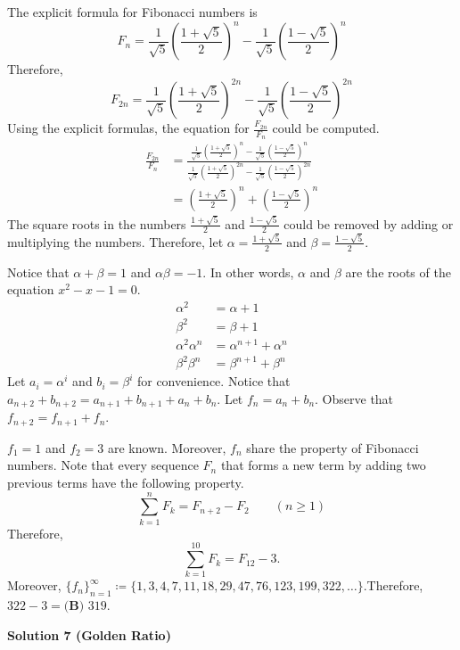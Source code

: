 \begin{enumerate}
 The explicit formula for Fibonacci numbers is
 \[F_n = \frac{1}{\sqrt{5}} \left( \frac{1 + \sqrt{5}}{2} \right)^n - \frac{1}{\sqrt{5}} \left( \frac{1 - \sqrt{5}}{2} \right)^n\]Therefore,
 \[F_{2n} = \frac{1}{\sqrt{5}} \left( \frac{1 + \sqrt{5}}{2} \right)^{2n} - \frac{1}{\sqrt{5}} \left( \frac{1 - \sqrt{5}}{2} \right)^{2n}\]Using the explicit formulas, the equation for $\frac{F_{2n}}{F_n}$ could be computed.
 \begin{align*}     \frac{F_{2n}}{F_n}     &= \frac{\frac{1}{\sqrt{5}} \left( \frac{1 + \sqrt{5}}{2} \right)^n - \frac{1}{\sqrt{5}} \left( \frac{1 - \sqrt{5}}{2} \right)^n}{\frac{1}{\sqrt{5}} \left( \frac{1 + \sqrt{5}}{2} \right)^{2n} - \frac{1}{\sqrt{5}} \left( \frac{1 - \sqrt{5}}{2} \right)^{2n}} \\     &= \left( \frac{1 + \sqrt{5}}{2} \right)^n + \left( \frac{1 - \sqrt{5}}{2} \right)^n \end{align*}
The square roots in the numbers $\frac{1 + \sqrt{5}}{2}$ and $\frac{1 - \sqrt{5}}{2}$ could be removed by adding or multiplying the numbers. Therefore, let $\alpha = \frac{1 + \sqrt{5}}{2}$ and $\beta = \frac{1 - \sqrt{5}}{2}$.

 
Notice that $\alpha + \beta = 1$ and $\alpha\beta = -1$. In other words, $\alpha$ and $\beta$ are the roots of the equation $x^2 - x - 1 = 0$.
 \begin{align*}     \alpha^2 &= \alpha + 1 \\     \beta^2 &= \beta + 1 \\     \alpha^2 \alpha^n &= \alpha^{n + 1} + \alpha^n \\     \beta^2 \beta^n &= \beta^{n + 1} + \beta^n \end{align*}
Let $a_i = \alpha^i$ and $b_i = \beta^i$ for convenience. Notice that $a_{n + 2} + b_{n + 2} = a_{n + 1} + b_{n + 1} + a_n + b_n$. Let $f_n = a_n + b_n$. Observe that $f_{n + 2} = f_{n + 1} + f_n$.

 
$f_1 = 1$ and $f_2 = 3$ are known. Moreover, $f_n$ share the property of Fibonacci numbers. Note that every sequence $F_n$ that forms a new term by adding two previous terms have the following property.
 \[\sum_{k=1}^{n} F_k = F_{n+2} - F_2 \qquad (n \geq 1)\]Therefore,
 \[\sum_{k=1}^{10} F_k = F_{12} - 3.\]Moreover, $\{f_n\}_{n=1}^\infty \coloneq \{ 1, 3, 4, 7, 11, 18, 29, 47, 76, 123, 199, 322, \dots \}$.Therefore, $322 - 3 = \boxed{\textbf{(B) }319}$.

 



\textbf{Solution 7 (Golden Ratio)}


\end{enumerate}
